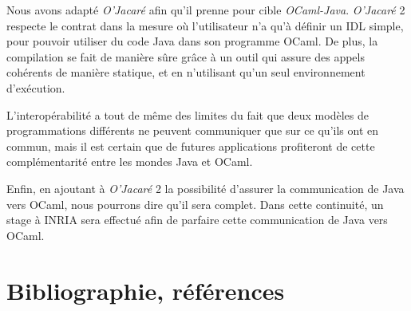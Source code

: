 \documentclass[a4paper, 11pt]{article}
\begin{document}
Nous avons adapté \emph{O'Jacaré} afin qu'il prenne pour cible
\emph{OCaml-Java}.  \emph{O'Jacaré} 2 respecte le contrat dans la
mesure où l'utilisateur n'a qu'à définir un IDL simple, pour pouvoir
utiliser du code Java dans son programme OCaml.  De plus, la
compilation se fait de manière sûre grâce à un outil qui assure des
appels cohérents de manière statique, et en n'utilisant qu'un seul environnement d'exécution.

L'interopérabilité a tout de même des limites du fait que deux modèles
de programmations différents ne peuvent communiquer que sur ce qu'ils
ont en commun, mais il est certain que de futures applications
profiteront de cette complémentarité entre les mondes Java et OCaml.

Enfin, en ajoutant à \emph{O'Jacaré} 2 la possibilité d'assurer la
communication de Java vers OCaml, nous pourrons dire qu'il
sera complet. Dans cette continuité, un stage à INRIA sera effectué afin de parfaire cette communication de Java vers OCaml.






























\newpage
\section*{Bibliographie, références}
\end{document}

